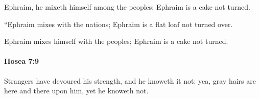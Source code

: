 			\begin{versebox}
					\item[BHS] 
					\item[LXX] 
					\item[ASV] Ephraim, he mixeth himself among the peoples; Ephraim is a cake not turned.
					\item[NIV] “Ephraim mixes with the nations; Ephraim is a flat loaf not turned over.
					\item[NRSV] Ephraim mixes himself with the peoples; Ephraim is a cake not turned.
			\end{versebox}

		\paragraph{Hosea 7:9} %
			\label{HOSEA-7-9}

			Strangers have devoured his strength, and he knoweth it not: yea, gray hairs are here and there upon him, yet he knoweth not.

